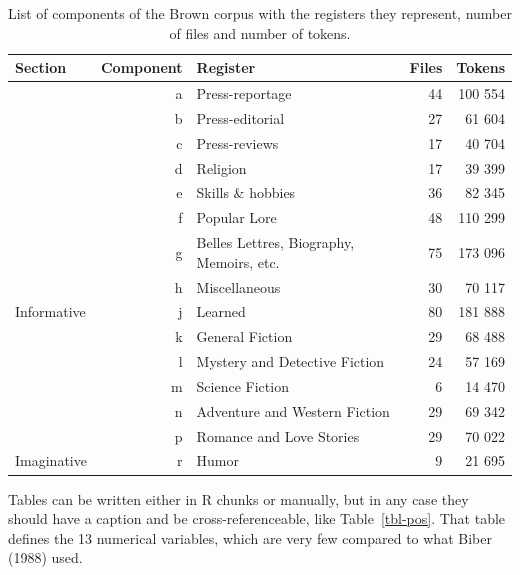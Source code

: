 \documentclass[
  letterpaper,
  DIV=11,
  numbers=noendperiod]{scrartcl}
\begin{document}
\hypertarget{tbl-registers}{}
\begin{table}
\caption{\label{tbl-registers}List of components of the Brown corpus with the registers they
represent, number of files and number of tokens. }\tabularnewline

\centering
\begin{tabular}[t]{l|r|l|r|r}
\hline
Section & Component & Register & Files & Tokens\\
\hline
 & a & Press-reportage & 44 & 100 554\\
\cline{2-5}
 & b & Press-editorial & 27 & 61 604\\
\cline{2-5}
 & c & Press-reviews & 17 & 40 704\\
\cline{2-5}
 & d & Religion & 17 & 39 399\\
\cline{2-5}
 & e & Skills \& hobbies & 36 & 82 345\\
\cline{2-5}
 & f & Popular Lore & 48 & 110 299\\
\cline{2-5}
 & g & Belles Lettres, Biography, Memoirs, etc. & 75 & 173 096\\
\cline{2-5}
 & h & Miscellaneous & 30 & 70 117\\
\cline{2-5}
\multirow{-9}{*}{\raggedright\arraybackslash Informative} & j & Learned & 80 & 181 888\\
\cline{1-5}
 & k & General Fiction & 29 & 68 488\\
\cline{2-5}
 & l & Mystery and Detective Fiction & 24 & 57 169\\
\cline{2-5}
 & m & Science Fiction & 6 & 14 470\\
\cline{2-5}
 & n & Adventure and Western Fiction & 29 & 69 342\\
\cline{2-5}
 & p & Romance and Love Stories & 29 & 70 022\\
\cline{2-5}
\multirow{-6}{*}{\raggedright\arraybackslash Imaginative} & r & Humor & 9 & 21 695\\
\hline
\end{tabular}
\end{table}

Tables can be written either in R chunks or manually, but in any case
they should have a caption and be cross-referenceable, like
Table~\ref{tbl-pos}. That table defines the 13 numerical variables,
which are very few compared to what Biber (1988) used.
\end{document}
